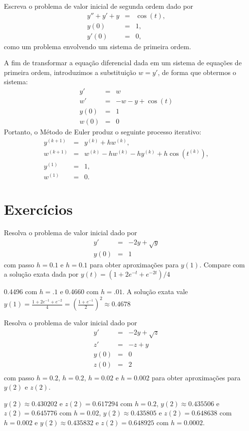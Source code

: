 \begin{ex} Escreva o problema de valor inicial de segunda ordem dado por
\begin{eqnarray*}
y''+y'+y&=&\cos(t),\\
y(0)&=&1,\\
y'(0)&=&0,
\end{eqnarray*}
como um problema envolvendo um sistema de primeira ordem.
\end{ex}
A fim de transformar a equação diferencial dada em um sistema de equações de primeira ordem, introduzimos a substituição $w=y'$, de forma que obtermos o sistema:
\begin{eqnarray*}
y'&=&w\\
w'&=&-w-y+\cos(t)\\
y(0)&=&1\\
w(0)&=&0
\end{eqnarray*}
Portanto, o Método de Euler produz o seguinte processo iterativo:
\begin{eqnarray*}
y^{(k+1)}&=&y^{(k)}+hw^{(k)},\\
w^{(k+1)}&=&w^{(k)}-hw^{(k)}-hy^{(k)}+h\cos(t^{(k)}),\\
y^{(1)}&=&1,\\
w^{(1)}&=&0.
\end{eqnarray*}
\section*{Exercícios}

\begin{Exercise}Resolva o problema de valor inicial dado por
\begin{eqnarray*}
y'&=& -2y + \sqrt{y}\\
y(0)&=&1
\end{eqnarray*}
com passo $h=0.1$ e $h=0.1$ para obter aproximações para $y(1)$. Compare com a solução exata dada por $y(t) =  \left({1+2 e^{-t}+e^{-2 t}}\right)/{4}$
\end{Exercise}
\begin{Answer}
 0.4496 com $h=.1$ e 0.4660 com $h=.01$. A solução exata vale $y(1)=\frac{1+2e^{-1}+e^{-2}}{4}= \left(\frac{1+e^{-1}}{2}\right)^2\approx 0.4678$
\end{Answer}


\begin{Exercise}Resolva o problema de valor inicial dado por
\begin{eqnarray*}
y'&=& -2y + \sqrt{z}\\
z'&=& -z + y\\
y(0)&=&0\\
z(0)&=&2\\
\end{eqnarray*}
com passo $h=0.2$, $h=0.2$, $h=0.02$ e $h=0.002$ para obter aproximações para $y(2)$ e $z(2)$.
\end{Exercise}
\begin{Answer}
$y(2)\approx 0.430202$ e $z(2)=0.617294$ com $h=0.2$, 
$y(2)\approx 0.435506$ e $z(2)=0.645776$ com $h=0.02$,
$y(2)\approx 0.435805$ e $z(2)=0.648638$ com $h=0.002$ e 
$y(2)\approx 0.435832$ e $z(2)=0.648925$ com $h=0.0002$. 
\end{Answer}

